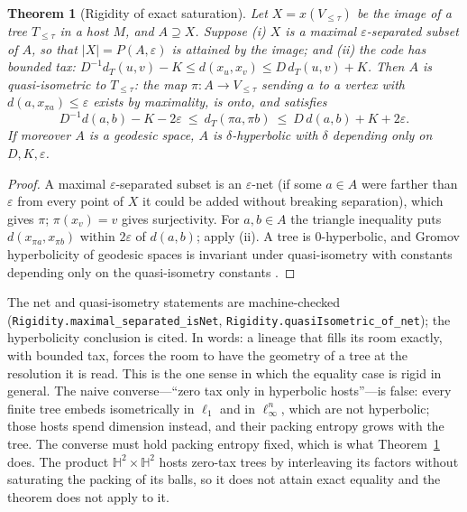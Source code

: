 \documentclass[11pt,reqno]{amsart}
\theoremstyle{plain}
\newtheorem{theorem}{Theorem}[section]
\theoremstyle{definition}
\newcommand{\Htwo}{\mathbb{H}^2}
\newcommand{\eps}{\varepsilon}
\begin{document}
\begin{theorem}[Rigidity of exact saturation]\label{thm:rigid}
Let $X=x(V_{\le\tau})$ be the image of a tree $T_{\le\tau}$ in a host $M$, and $A\supseteq X$. Suppose (i) $X$ is a maximal $\eps$-separated subset of $A$, so that $|X|=P(A,\eps)$ is attained by the image; and (ii) the code has bounded tax: $D^{-1}d_T(u,v)-K\le d(x_u,x_v)\le D\,d_T(u,v)+K$. Then $A$ is quasi-isometric to $T_{\le\tau}$: the map $\pi:A\to V_{\le\tau}$ sending $a$ to a vertex with $d(a,x_{\pi a})\le\eps$ exists by maximality, is onto, and satisfies
\[
D^{-1}d(a,b)-K-2\eps\ \le\ d_T(\pi a,\pi b)\ \le\ D\,d(a,b)+K+2\eps .
\]
If moreover $A$ is a geodesic space, $A$ is $\delta$-hyperbolic with $\delta$ depending only on $D,K,\eps$.
\end{theorem}

\begin{proof}
A maximal $\eps$-separated subset is an $\eps$-net (if some $a\in A$ were farther than $\eps$ from every point of $X$ it could be added without breaking separation), which gives $\pi$; $\pi(x_v)=v$ gives surjectivity. For $a,b\in A$ the triangle inequality puts $d(x_{\pi a},x_{\pi b})$ within $2\eps$ of $d(a,b)$; apply (ii). A tree is $0$-hyperbolic, and Gromov hyperbolicity of geodesic spaces is invariant under quasi-isometry with constants depending only on the quasi-isometry constants \cite{gromov1987}.
\end{proof}

The net and quasi-isometry statements are machine-checked (\texttt{Rigidity.maximal\_separated\_isNet}, \texttt{Rigidity.quasiIsometric\_of\_net}); the hyperbolicity conclusion is cited. In words: a lineage that fills its room exactly, with bounded tax, forces the room to have the geometry of a tree at the resolution it is read. This is the one sense in which the equality case is rigid in general. The naive converse---``zero tax only in hyperbolic hosts''---is false: every finite tree embeds isometrically in $\ell_1$ and in $\ell_\infty^n$, which are not hyperbolic; those hosts spend dimension instead, and their packing entropy grows with the tree. The converse must hold packing entropy fixed, which is what Theorem~\ref{thm:rigid} does. The product $\Htwo\times\Htwo$ hosts zero-tax trees by interleaving its factors without saturating the packing of its balls, so it does not attain exact equality and the theorem does not apply to it.
\end{document}
